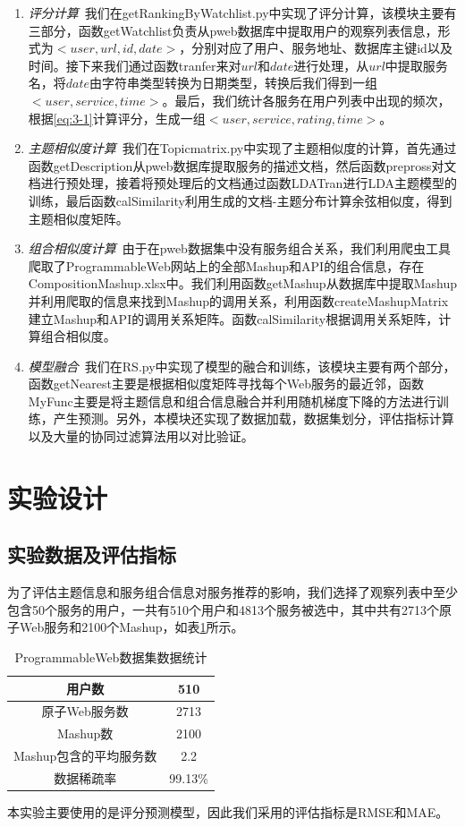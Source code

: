 \documentclass[master,winfonts]{njuthesis}
\newcommand{\li}{\uline{\hspace{0.5em}}}
\begin{document}
\begin{enumerate}
\item \emph{评分计算}~我们在getRankingByWatchlist.py中实现了评分计算，该模块主要有三部分，函数getWatchlist负责从pweb数据库中提取用户的观察列表信息，形式为$<user,url,id,date>$，分别对应了用户、服务地址、数据库主键id以及时间。接下来我们通过函数tranfer来对$url$和$date$进行处理，从$url$中提取服务名，将$date$由字符串类型转换为日期类型，转换后我们得到一组$<user,service,time>$。最后，我们统计各服务在用户列表中出现的频次，根据\eqref{eq:3-1}计算评分，生成一组$<user,service,rating,time>$。
\item \emph{主题相似度计算}~我们在Topic\li matrix.py中实现了主题相似度的计算，首先通过函数getDescription从pweb数据库提取服务的描述文档，然后函数prepross对文档进行预处理，接着将预处理后的文档通过函数LDATran进行LDA主题模型的训练，最后函数calSimilarity利用生成的文档-主题分布计算余弦相似度，得到主题相似度矩阵。

\item \emph{组合相似度计算}~由于在pweb数据集中没有服务组合关系，我们利用爬虫工具爬取了ProgrammableWeb网站上的全部Mashup和API的组合信息，存在Composition\li Mashup.xlsx中。我们利用函数getMashup从数据库中提取Mashup并利用爬取的信息来找到Mashup的调用关系，利用函数createMashupMatrix建立Mashup和API的调用关系矩阵。函数calSimilarity根据调用关系矩阵，计算组合相似度。

\item \emph{模型融合}~我们在RS.py中实现了模型的融合和训练，该模块主要有两个部分，函数getNearest主要是根据相似度矩阵寻找每个Web服务的最近邻，函数MyFunc主要是将主题信息和组合信息融合并利用随机梯度下降的方法进行训练，产生预测。另外，本模块还实现了数据加载，数据集划分，评估指标计算以及大量的协同过滤算法用以对比验证。
\end{enumerate}

\section{实验设计}
\subsection{实验数据及评估指标}
为了评估主题信息和服务组合信息对服务推荐的影响，我们选择了观察列表中至少包含50个服务的用户，一共有510个用户和4813个服务被选中，其中共有2713个原子Web服务和2100个Mashup，如表\ref{table:3-6}所示。
\begin{table}[h]
\centering
\caption{ProgrammableWeb数据集数据统计}
\label{table:3-6}
\begin{tabular}{|c|c|}
\hline
用户数            & 510     \\ \hline
原子Web服务数       & 2713    \\ \hline
Mashup数        & 2100    \\ \hline
Mashup包含的平均服务数 & 2.2     \\ \hline
数据稀疏率          & 99.13\% \\ \hline
\end{tabular}%
\end{table}
本实验主要使用的是评分预测模型，因此我们采用的评估指标是RMSE和MAE。
\end{document}
